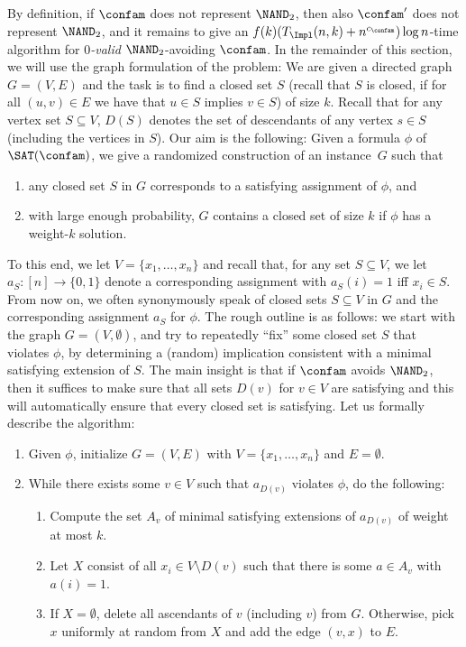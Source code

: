 \noindent 
By definition, if $\confam$ does not represent $\NAND_2$, then also $\confam'$ does not represent $\NAND_2$, and it remains to give an $f(k)(T_\Impl(n,k) + n^{c_\confam})\log n$-time algorithm for \emph{$0$-valid} $\NAND_2$-avoiding $\confam$.  
%
In the remainder of this section, we will use the graph formulation of the \Implication problem: We are given a directed graph $G=(V,E)$ and the task is to find a closed set $S$ (recall that $S$ is closed, if for all $(u,v)\in E$ we have that $u\in S$ implies $v\in S$) of size $k$. Recall that for any vertex set $S\subseteq V$, $D(S)$ denotes the set of descendants of any vertex $s \in S$ (including the vertices in $S$).
%
Our aim is the following: Given a formula $\phi$ of $\SAT(\confam)$, we give a randomized construction of an \Implication instance~$G$ such that 
\begin{enumerate}[label=(\roman*),nosep]
\item any closed set $S$ in $G$ corresponds to a satisfying assignment of $\phi$, and 
\item with large enough probability, $G$ contains a closed set of size $k$ if $\phi$ has a weight-$k$ solution.
\end{enumerate}
To this end, we let $V=\{x_1, \dots, x_n\}$ and recall that, for any set $S\subseteq V$, we let $a_S: [n]\to \{0,1\}$ denote a corresponding assignment with $a_S(i) = 1$ iff $x_i \in S$. From now on, we often synonymously speak of closed sets $S\subseteq V$ in $G$ and the corresponding assignment $a_S$ for $\phi$.
%
The rough outline is as follows: we start with the graph $G=(V,\emptyset)$, and try to repeatedly ``fix'' some closed set $S$ that violates $\phi$, by determining a (random) implication consistent with a minimal satisfying extension of $S$. The main insight is that if $\confam$ avoids $\NAND_2$, then it suffices to make sure that all sets $D(v)$ for $v\in V$ are satisfying and this will automatically ensure that every closed set is satisfying.
%
Let us formally describe the algorithm: 
\begin{enumerate}
\item Given $\phi$, initialize $G= (V,E)$ with $V=\{x_1,\dots, x_n\}$ and $E=\emptyset$.
\item While there exists some $v\in V$ such that $a_{D(v)}$ violates $\phi$, do the following:
\begin{enumerate}
\item Compute the set $A_v$ of minimal satisfying extensions of $a_{D(v)}$ of weight at most $k$.
\item Let $X$ consist of all $x_i \in V\setminus D(v)$ such that there is some $a\in A_v$ with $a(i) = 1$.
\item If $X = \emptyset$, delete all ascendants of $v$ (including $v$) from $G$. Otherwise, pick $x$ uniformly at random from $X$ and add the edge $(v,x)$ to $E$.
\end{enumerate}
\end{enumerate}
